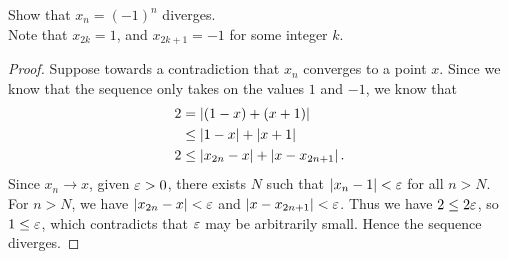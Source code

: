 \documentclass[class=article, crop=false]{standalone}
\begin{document}
  \begin{example}{}
    Show that $x_n = (-1)^n$ diverges. \\[10pt]
    Note that $x_{2k} = 1$, and $x_{2k + 1} = -1$ for some integer $k$.
    \begin{proof}
      Suppose towards a contradiction that $x_n$ converges to a point $x$. Since we know that the sequence only takes on the values $1$ and $-1$, we know that
      \begin{align*}
        2 &= \left\lvert (1 - x) + (x + 1) \right\rvert \\
          &\leq \left\lvert 1 - x \right\rvert + \left\lvert x + 1 \right\rvert \\
        2 &\leq \left\lvert x_{2n} - x \right\rvert + \left\lvert x - x_{2n + 1} \right\rvert.
      \end{align*}
      Since $x_n\to x$, given $\varepsilon > 0$, there exists $N$ such that $\left\lvert x_n - 1 \right\rvert < \varepsilon$ for all $n > N$. For $n > N$, we have $\left\lvert x_{2n} - x \right\rvert < \varepsilon$ and $\left\lvert x - x_{2n + 1} \right\rvert < \varepsilon$. Thus we have $2\leq 2\varepsilon$, so $1\leq \varepsilon$, which contradicts that $\varepsilon$ may be arbitrarily small. Hence the sequence diverges.
    \end{proof}
  \end{example}
\end{document}
